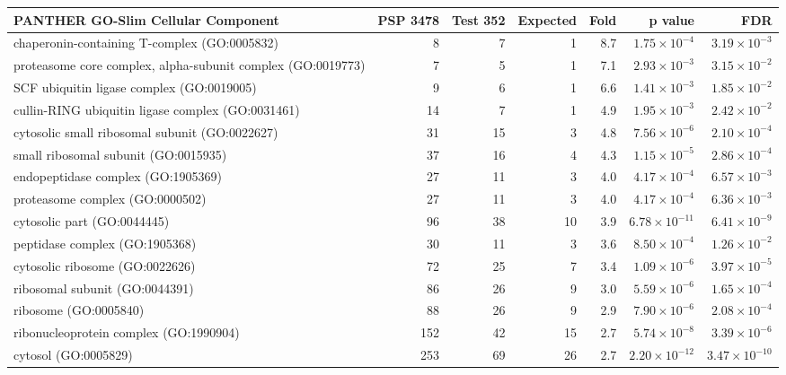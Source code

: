 \begin{table}[ht]
\centering
\begin{adjustbox}{width=\textwidth}
\begin{tabular}{lrrrrrr}
  \hline
PANTHER GO-Slim Cellular Component & PSP 3478 & Test 352 & Expected & Fold & p value & FDR \\ 
  \hline
chaperonin-containing T-complex (GO:0005832) & 8 & 7 & 1 & 8.7 & $1.75 \times 10^{-4}$ & $3.19 \times 10^{-3}$ \\ 
  proteasome core complex, alpha-subunit complex (GO:0019773) & 7 & 5 & 1 & 7.1 & $2.93 \times 10^{-3}$ & $3.15 \times 10^{-2}$ \\ 
  SCF ubiquitin ligase complex (GO:0019005) & 9 & 6 & 1 & 6.6 & $1.41 \times 10^{-3}$ & $1.85 \times 10^{-2}$ \\ 
  cullin-RING ubiquitin ligase complex (GO:0031461) & 14 & 7 & 1 & 4.9 & $1.95 \times 10^{-3}$ & $2.42 \times 10^{-2}$ \\ 
  cytosolic small ribosomal subunit (GO:0022627) & 31 & 15 & 3 & 4.8 & $7.56 \times 10^{-6}$ & $2.10 \times 10^{-4}$ \\ 
  small ribosomal subunit (GO:0015935) & 37 & 16 & 4 & 4.3 & $1.15 \times 10^{-5}$ & $2.86 \times 10^{-4}$ \\ 
  endopeptidase complex (GO:1905369) & 27 & 11 & 3 & 4.0 & $4.17 \times 10^{-4}$ & $6.57 \times 10^{-3}$ \\ 
  proteasome complex (GO:0000502) & 27 & 11 & 3 & 4.0 & $4.17 \times 10^{-4}$ & $6.36 \times 10^{-3}$ \\ 
  cytosolic part (GO:0044445) & 96 & 38 & 10 & 3.9 & $6.78 \times 10^{-11}$ & $6.41 \times 10^{-9}$ \\ 
  peptidase complex (GO:1905368) & 30 & 11 & 3 & 3.6 & $8.50 \times 10^{-4}$ & $1.26 \times 10^{-2}$ \\ 
  cytosolic ribosome (GO:0022626) & 72 & 25 & 7 & 3.4 & $1.09 \times 10^{-6}$ & $3.97 \times 10^{-5}$ \\ 
  ribosomal subunit (GO:0044391) & 86 & 26 & 9 & 3.0 & $5.59 \times 10^{-6}$ & $1.65 \times 10^{-4}$ \\ 
  ribosome (GO:0005840) & 88 & 26 & 9 & 2.9 & $7.90 \times 10^{-6}$ & $2.08 \times 10^{-4}$ \\ 
  ribonucleoprotein complex (GO:1990904) & 152 & 42 & 15 & 2.7 & $5.74 \times 10^{-8}$ & $3.39 \times 10^{-6}$ \\ 
  cytosol (GO:0005829) & 253 & 69 & 26 & 2.7 & $2.20 \times 10^{-12}$ & $3.47 \times 10^{-10}$ \\ 

\end{tabular}
\end{adjustbox}
\end{table}
